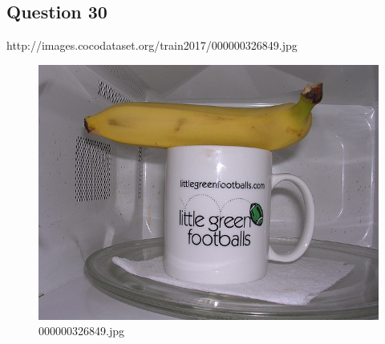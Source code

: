     \subsection*{Question 30}
    http://images.cocodataset.org/train2017/000000326849.jpg
    \begin{figure}[h]
        \centering
        \includegraphics[width=0.8\linewidth]{../image set/easy/000000326849.jpg}
        \caption{000000326849.jpg}
    \end{figure}
